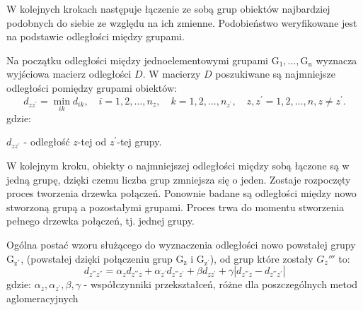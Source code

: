 \documentclass[12pt,a4paper]{report}
\begin{document}
W kolejnych krokach następuje łączenie ze sobą grup obiektów najbardziej podobnych do siebie ze względu na ich zmienne. Podobieństwo weryfikowane jest na podstawie odległości między grupami.  %

Na początku odległości między jednoelementowymi grupami $\mathrm{G_{1}},\dots,\mathrm{G_{n}}$ wyznacza wyjściowa macierz odległości $D$. W macierzy $D$ poszukiwane są najmniejsze odległości pomiędzy grupami obiektów:
$$
d_{zz^{'}}= \min\limits_{ik} {d_{ik}}, \quad i=1,2,\dots,n_{z}, \quad k=1,2,\dots,n_{z^{'}}, \quad z,z^{'}=1,2,\dots,n, z\neq z^{'}.
$$
gdzie:

$d_{zz^{'}}$ - odległość $z$-tej od $z^{'}$-tej grupy.

W kolejnym kroku, obiekty o najmniejszej odległości między sobą łączone są w jedną grupę, dzięki czemu liczba grup zmniejsza się o jeden. Zostaje rozpoczęty proces tworzenia drzewka połączeń. Ponownie badane są odległości między nowo stworzoną grupą a pozostałymi grupami. Proces trwa do momentu stworzenia pełnego drzewka połączeń, tj. jednej grupy. 


Ogólna postać wzoru służącego do wyznaczenia odległości nowo powstałej grupy $\mathrm{G_{z^{''}}}$, (powstałej dzięki połączeniu grup $\mathrm{G_{z}}$ i $\mathrm{G_{z^{'}}}$), od grup które zostały ${G_z{'''}}$ to:
$$
d_{z^{'''}z^{''}}=\alpha_{z}d_{z^{'''}z} + \alpha_{z^{'}}d_{z^{'''}z^{'}} + \beta d_{zz^{'}} + \gamma|d_{z^{'''}z} - d_{z^{'''}z^{'}}| 
$$
gdzie:
$\alpha_{z},\alpha_{z^{'}}, \beta, \gamma$ - współczynniki przekształceń, różne dla poszczególnych metod aglomeracyjnych
\end{document}
